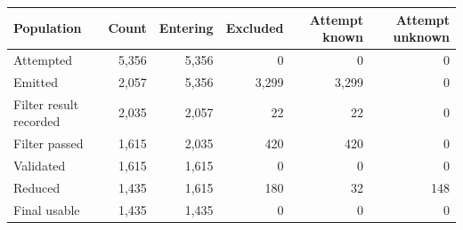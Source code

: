   \renewcommand{\theHreporttablerow}{rq6_generalization_funnel.\arabic{reporttablerow}}
  \setcounter{reporttablerow}{0}
  \begin{tabular}{lrrrrr}
  \toprule
  Population & Count & Entering & Excluded & Attempt known & Attempt unknown \\
  \midrule
  {reporttablerow}\label{tabrow:rq6_generalization_funnel:attempted}Attempted & 5,356 & 5,356 & 0 & 0 & 0 \\
  {reporttablerow}\label{tabrow:rq6_generalization_funnel:emitted}Emitted & 2,057 & 5,356 & 3,299 & 3,299 & 0 \\
  {reporttablerow}\label{tabrow:rq6_generalization_funnel:filter_result_recorded}Filter result recorded & 2,035 & 2,057 & 22 & 22 & 0 \\
  {reporttablerow}\label{tabrow:rq6_generalization_funnel:filter_passed}Filter passed & 1,615 & 2,035 & 420 & 420 & 0 \\
  {reporttablerow}\label{tabrow:rq6_generalization_funnel:validated}Validated & 1,615 & 1,615 & 0 & 0 & 0 \\
  {reporttablerow}\label{tabrow:rq6_generalization_funnel:reduced}Reduced & 1,435 & 1,615 & 180 & 32 & 148 \\
  {reporttablerow}\label{tabrow:rq6_generalization_funnel:final_usable}Final usable & 1,435 & 1,435 & 0 & 0 & 0 \\
  \bottomrule
  \end{tabular}
